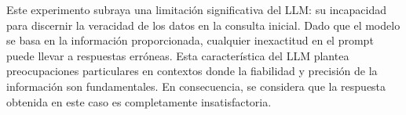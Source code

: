 Este experimento subraya una limitación significativa del LLM: su incapacidad para discernir la veracidad de los datos en la consulta inicial. 
Dado que el modelo se basa en la información proporcionada, cualquier inexactitud en el prompt puede llevar a respuestas erróneas. 
Esta característica del LLM plantea preocupaciones particulares en contextos donde la fiabilidad y precisión de la información son fundamentales. 
En consecuencia, se considera que la respuesta obtenida en este caso es completamente insatisfactoria.



